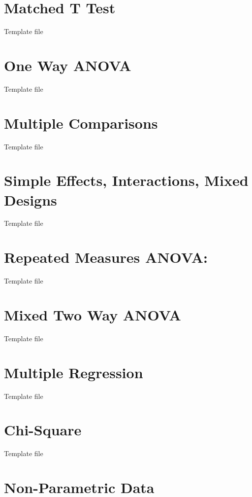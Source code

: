 \documentclass[]{book}
\theoremstyle{definition}
\theoremstyle{definition}
\theoremstyle{definition}
\theoremstyle{remark}
\begin{document}
\chapter{Matched T Test}\label{matched-t-test}

Template file

\chapter{One Way ANOVA}\label{one-way-anova}

Template file

\chapter{Multiple Comparisons}\label{multiple-comparisons}

Template file

\chapter{Simple Effects, Interactions, Mixed
Designs}\label{simple-effects-interactions-mixed-designs}

Template file

\chapter{Repeated Measures ANOVA:}\label{repeated-measures-anova}

Template file

\chapter{Mixed Two Way ANOVA}\label{mixed-two-way-anova}

Template file

\chapter{Multiple Regression}\label{multiple-regression}

Template file

\chapter{Chi-Square}\label{chi-square}

Template file

\chapter{Non-Parametric Data}\label{non-parametric-data}
\end{document}

